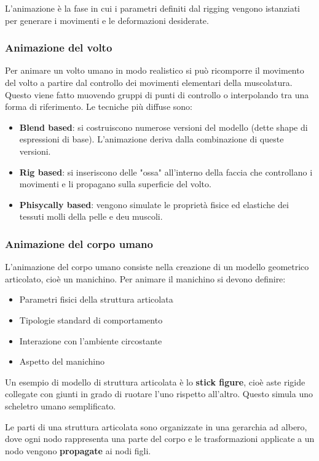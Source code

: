 \documentclass[a4paper]{article}
\begin{document}
\vspace{1em}
\noindent
L'animazione è la fase in cui i parametri definiti dal rigging vengono istanziati per
generare i movimenti e le deformazioni desiderate.

\subsubsection{Animazione del volto}
Per animare un volto umano in modo realistico si può ricomporre il movimento del volto a
partire dal controllo dei movimenti elementari della muscolatura. Questo viene fatto
muovendo gruppi di punti di controllo o interpolando tra una forma di riferimento.
Le tecniche più diffuse sono:
\begin{itemize}
  \item \textbf{Blend based}: si costruiscono numerose versioni del modello
    (dette shape di espressioni di base). L'animazione deriva dalla combinazione
    di queste versioni.
  \item \textbf{Rig based}: si inseriscono delle "ossa" all'interno della faccia che
    controllano i movimenti e li propagano sulla superficie del volto.
  \item \textbf{Phisycally based}: vengono simulate le proprietà fisice ed elastiche dei tessuti
    molli della pelle e deu muscoli.
\end{itemize}

\subsubsection{Animazione del corpo umano}
L'animazione del corpo umano consiste nella creazione di un modello geometrico articolato,
cioè un manichino. Per animare il manichino si devono definire:
\begin{itemize}
  \item Parametri fisici della struttura articolata
  \item Tipologie standard di comportamento
  \item Interazione con l'ambiente circostante
  \item Aspetto del manichino
\end{itemize}
Un esempio di modello di struttura articolata è lo \textbf{stick figure}, cioè aste
rigide collegate con giunti in grado di ruotare l'uno rispetto all'altro. Questo simula
uno scheletro umano semplificato.

\vspace{1em}
\noindent
Le parti di una struttura articolata sono organizzate in una gerarchia ad albero, dove
ogni nodo rappresenta una parte del corpo e le trasformazioni applicate a un nodo
vengono \textbf{propagate} ai nodi figli.
\end{document}

